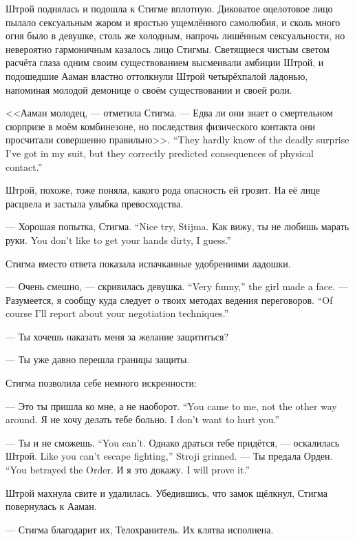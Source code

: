 \textspace

Штрой поднялась и подошла к Стигме вплотную.
Диковатое оцелотовое лицо пылало сексуальным жаром и яростью ущемлённого самолюбия, и сколь много огня было в девушке, столь же холодным, напрочь лишённым сексуальности, но невероятно гармоничным казалось лицо Стигмы.
Светящиеся чистым светом расчёта глаза одним своим существованием высмеивали амбиции Штрой, и подошедшие Ааман властно оттолкнули Штрой четырёхпалой ладонью, напоминая молодой демонице о своём существовании и своей роли.

<<Ааман молодец, --- отметила Стигма.
{--- Едва ли они знает о смертельном сюрпризе в моём комбинезоне, но последствия физического контакта они просчитали совершенно правильно>>.}
{``They hardly know of the deadly surprise I've got in my suit, but they correctly predicted consequences of physical contact.''}

Штрой, похоже, тоже поняла, какого рода опасность ей грозит.
На её лице расцвела и застыла улыбка превосходства.

{--- Хорошая попытка, Стигма.}
{``Nice try, Stijma.}
{Как вижу, ты не любишь марать руки.}
{You don't like to get your hands dirty, I guess.''}

Стигма вместо ответа показала испачканные удобрениями ладошки.

{--- Очень смешно, --- скривилась девушка.}
{``Very funny,'' the girl made a face.}
{--- Разумеется, я сообщу куда следует о твоих методах ведения переговоров.}
{``Of course I'll report about your negotiation techniques.''}

--- Ты хочешь наказать меня за желание защититься?

--- Ты уже давно перешла границы защиты.

Стигма позволила себе немного искренности:

{--- Это ты пришла ко мне, а не наоборот.}
{``You came to me, not the other way around.}
{Я не хочу делать тебе больно.}
{I don't want to hurt you.''}

{--- Ты и не сможешь.}
{``You can't.}
{Однако драться тебе придётся, --- оскалилась Штрой.}
{Like you can't escape fighting,'' Stroji grinned.}
{--- Ты предала Орден.}
{``You betrayed the Order.}
{И я это докажу.}
{I will prove it.''}

Штрой махнула свите и удалилась.
Убедившись, что замок щёлкнул, Стигма повернулась к Ааман.

--- Стигма благодарит их, Телохранитель.
Их клятва исполнена.

